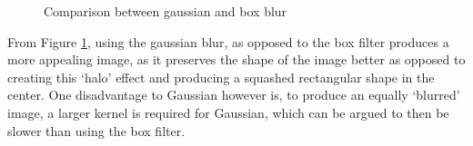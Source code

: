 \documentclass[twoside,a4paper,article]{combine}
\begin{document}
\begin{minipage}{\textwidth}\begin{figure}[H]
    \captionsetup{justification=centering}
    \centering
    \caption{Comparison between gaussian and box blur}\label{fig:gauss_box}
\end{figure}\end{minipage}
From Figure \ref{fig:gauss_box}, using the gaussian blur, as opposed to
the box filter produces a more appealing image, as it preserves the shape of the image better as opposed to creating this `halo' effect
and producing a squashed rectangular shape in the center. One disadvantage to Gaussian however is, to produce an equally `blurred' image, a larger kernel is required for Gaussian, which can be argued to then be slower
than using the box filter\cite{Gonzalez_Woods_2018}.
\end{document}
